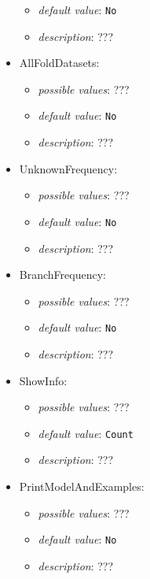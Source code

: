 \documentclass{article}
\begin{document}
\begin{itemize}
\begin{itemize}
                \item \emph{default value}: \texttt{No}
                \item \emph{description}: ???
           \end{itemize}
    \item AllFoldDatasets:
           \begin{itemize}
                \item \emph{possible values}: ???
                \item \emph{default value}: \texttt{No}
                \item \emph{description}: ???
           \end{itemize}
    \item UnknownFrequency:
           \begin{itemize}
                \item \emph{possible values}: ???
                \item \emph{default value}: \texttt{No}
                \item \emph{description}: ???
           \end{itemize}
    \item BranchFrequency:
           \begin{itemize}
                \item \emph{possible values}: ???
                \item \emph{default value}: \texttt{No}
                \item \emph{description}: ???
           \end{itemize}
    \item ShowInfo:
           \begin{itemize}
                \item \emph{possible values}: ???
                \item \emph{default value}: \texttt{{Count}}
                \item \emph{description}: ???
           \end{itemize}
    \item PrintModelAndExamples:
           \begin{itemize}
                \item \emph{possible values}: ???
                \item \emph{default value}: \texttt{No}
                \item \emph{description}: ???
           \end{itemize}

\end{itemize}
\end{document}
